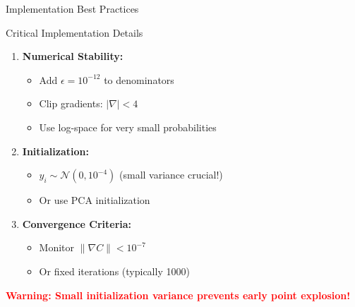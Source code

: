 \documentclass[aspectratio=169]{beamer}
\newcommand{\conceptbox}[2]{\colorbox{#1!20}{\textcolor{#1}{\textbf{#2}}}}
\newcommand{\warning}[1]{\conceptbox{red}{Warning: #1}}
\begin{document}
\begin{frame}{Implementation Best Practices}
\begin{block}{Critical Implementation Details}
\begin{enumerate}
\item \textbf{Numerical Stability:}
    \begin{itemize}
    \item Add $\epsilon = 10^{-12}$ to denominators
    \item Clip gradients: $|\nabla| < 4$
    \item Use log-space for very small probabilities
    \end{itemize}
    
\item \textbf{Initialization:}
    \begin{itemize}
    \item $y_i \sim \mathcal{N}(0, 10^{-4})$ (small variance crucial!)
    \item Or use PCA initialization
    \end{itemize}
    
\item \textbf{Convergence Criteria:}
    \begin{itemize}
    \item Monitor $\|\nabla C\| < 10^{-7}$
    \item Or fixed iterations (typically 1000)
    \end{itemize}
\end{enumerate}
\end{block}

\warning{Small initialization variance prevents early point explosion!}
\end{frame}

\end{document}
